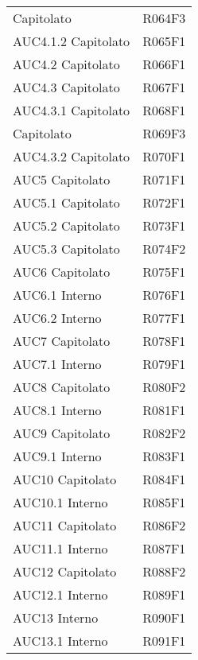 \documentclass[../analisi-dei-requisiti.tex]{subfiles}
\begin{document}
\begin{longtable}[H]{ p{4cm} | p{4cm} }
  Capitolato                    & R064F3                               \\
  AUC4.1.2 Capitolato           & R065F1                               \\
  AUC4.2 Capitolato             & R066F1                               \\
  AUC4.3 Capitolato             & R067F1                               \\
  AUC4.3.1 Capitolato           & R068F1                               \\
  Capitolato                    & R069F3                               \\
  AUC4.3.2 Capitolato           & R070F1                               \\
  AUC5 Capitolato               & R071F1                               \\
  AUC5.1 Capitolato             & R072F1                               \\
  AUC5.2 Capitolato             & R073F1                               \\
  AUC5.3 Capitolato             & R074F2                               \\
  AUC6 Capitolato               & R075F1                               \\
  AUC6.1 Interno                & R076F1                               \\
  AUC6.2 Interno                & R077F1                               \\
  AUC7 Capitolato               & R078F1                               \\
  AUC7.1 Interno                & R079F1                               \\
  AUC8 Capitolato               & R080F2                               \\
  AUC8.1 Interno                & R081F1                               \\
  AUC9 Capitolato               & R082F2                               \\
  AUC9.1 Interno                & R083F1                               \\
  AUC10 Capitolato              & R084F1                               \\
  AUC10.1 Interno               & R085F1                               \\
  AUC11 Capitolato              & R086F2                               \\
  AUC11.1 Interno               & R087F1                               \\
  AUC12 Capitolato              & R088F2                               \\
  AUC12.1 Interno               & R089F1                               \\
  AUC13 Interno                 & R090F1                               \\
  AUC13.1 Interno               & R091F1                               \\
\end{longtable}
\end{document}
